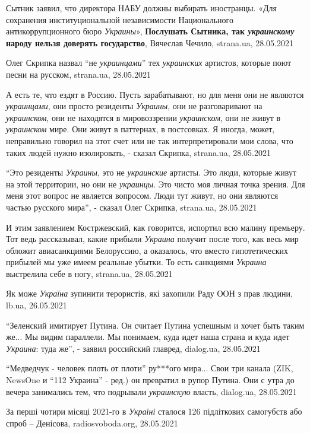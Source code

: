 Сытник заявил, что директора НАБУ должны выбирать иностранцы. «Для сохранения
институциональной независимости Национального антикоррупционного бюро
\emph{Украины}», \textbf{Послушать Сытника, так \emph{украинскому} народу
нельзя доверять государство}, Вячеслав Чечило, strana.ua, 28.05.2021

Олег Скрипка назвал \enquote{не \emph{украинцами}} тех \emph{украинских}
артистов, которые поют песни на русском, strana.ua, 28.05.2021

А есть те, что ездят в Россию. Пусть зарабатывают, но для меня они не являются
\emph{украинцами}, они просто резиденты \emph{Украины}, они не разговаривают на \emph{украинском},
они не находятся в мировоззрении \emph{украинском}, они не живут в \emph{украинском} мире.
Они живут в паттернах, в постсовках. Я иногда, может, неправильно говорил на
этот счет или не так интерпретировали мои слова, что таких людей нужно
изолировать, - сказал Скрипка, strana.ua, 28.05.2021

\enquote{Это резиденты \emph{Украины}, это не \emph{украинские} артисты. Это
люди, которые живут на этой территории, но они не \emph{украинцы}. Это чисто
моя личная точка зрения. Для меня этот вопрос не является вопросом. Люди тут
живут, но они являются частью русского мира}, - сказал Олег Скрипка, strana.ua,
28.05.2021

И этим заявлением Костржевский, как говорится, испортил всю малину премьеру.
Тот ведь рассказывал, какие прибыли \emph{Украина} получит после того, как весь мир
обложит авиасанкциями Белоруссию, а оказалось, что вместо гипотетических
прибылей мы уже имеем реальные убытки. То есть санкциями \emph{Украина} выстрелила
себе в ногу, strana.ua, 28.05.2021

Як може \emph{Україна} зупинити терористів, які захопили Раду ООН з прав
людини, lb.ua, 26.05.2021

\enquote{Зеленский имитирует Путина. Он считает Путина успешным и хочет быть таким же...
Мы видим параллели. Мы понимаем, куда идет наша страна и куда идет
\emph{Украина}: туда же}, - заявил российский главред, dialog.ua, 28.05.2021

\enquote{Медведчук - человек плоть от плоти} ру***ого мира... Свои три канала
(ZIK, NewsOne и \enquote{112 Украина} - ред.) он превратил в рупор Путина. Они
с утра до вечера занимались тем, что подрывали \emph{украинскую} власть,
dialog.ua, 28.05.2021

За перші чотири місяці 2021-го в \emph{Україні} сталося 126 підліткових
самогубств або спроб – Денісова, radiosvoboda.org, 28.05.2021

